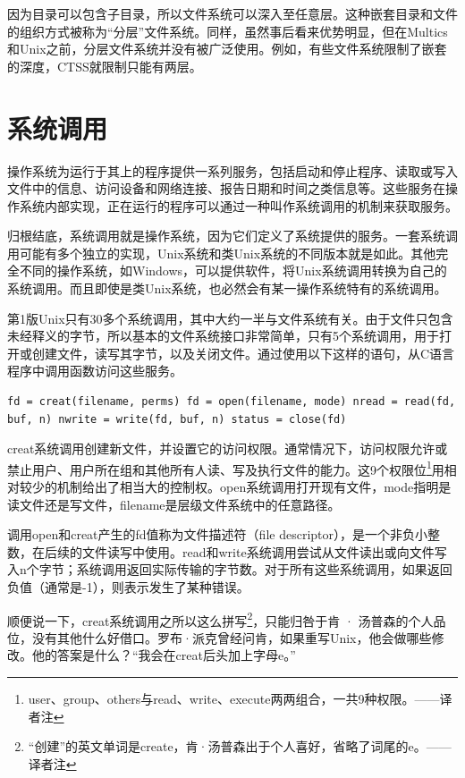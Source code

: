 \documentclass[a4paper,12pt,UTF8,twoside]{ctexbook}
\begin{document}
因为目录可以包含子目录，所以文件系统可以深入至任意层。这种嵌套目录和文件的组织方式被称为“分层”文件系统。同样，虽然事后看来优势明显，但在Multics和Unix之前，分层文件系统并没有被广泛使用。例如，有些文件系统限制了嵌套的深度，CTSS就限制只能有两层。

\section{系统调用}

操作系统为运行于其上的程序提供一系列服务，包括启动和停止程序、读取或写入文件中的信息、访问设备和网络连接、报告日期和时间之类信息等。这些服务在操作系统内部实现，正在运行的程序可以通过一种叫作系统调用的机制来获取服务。

归根结底，系统调用就是操作系统，因为它们定义了系统提供的服务。一套系统调用可能有多个独立的实现，Unix系统和类Unix系统的不同版本就是如此。其他完全不同的操作系统，如Windows，可以提供软件，将Unix系统调用转换为自己的系统调用。而且即使是类Unix系统，也必然会有某一操作系统特有的系统调用。

第1版Unix只有30多个系统调用，其中大约一半与文件系统有关。由于文件只包含未经释义的字节，所以基本的文件系统接口非常简单，只有5个系统调用，用于打开或创建文件，读写其字节，以及关闭文件。通过使用以下这样的语句，从C语言程序中调用函数访问这些服务。

\begin{lstlisting}
fd = creat(filename, perms) fd = open(filename, mode) nread = read(fd, buf, n) nwrite = write(fd, buf, n) status = close(fd)
\end{lstlisting}

creat系统调用创建新文件，并设置它的访问权限。通常情况下，访问权限允许或禁止用户、用户所在组和其他所有人读、写及执行文件的能力。这9个权限位\footnote{user、group、others与read、write、execute两两组合，一共9种权限。——译者注}用相对较少的机制给出了相当大的控制权。open系统调用打开现有文件，mode指明是读文件还是写文件，filename是层级文件系统中的任意路径。

调用open和creat产生的fd值称为文件描述符（file descriptor），是一个非负小整数，在后续的文件读写中使用。read和write系统调用尝试从文件读出或向文件写入n个字节；系统调用返回实际传输的字节数。对于所有这些系统调用，如果返回负值（通常是-1），则表示发生了某种错误。

顺便说一下，creat系统调用之所以这么拼写\footnote{“创建”的英文单词是create，肯·汤普森出于个人喜好，省略了词尾的e。——译者注}，只能归咎于肯 · 汤普森的个人品位，没有其他什么好借口。罗布·派克曾经问肯，如果重写Unix，他会做哪些修改。他的答案是什么？“我会在creat后头加上字母e。”
\end{document}
